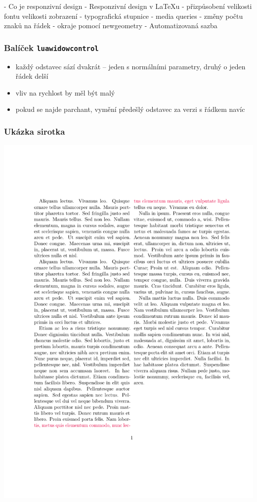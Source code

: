 - Co je responzivní design
- Responzivní design v LaTeXu
  - přizpůsobení velikosti fontu velikosti zobrazení
  - typografická stupnice
  - media queries
    - změny počtu znaků na řádek
    - okraje pomocí newgeometry
- Automatizovaná sazba

\begin{frame}
  \frametitle{Balíček \texttt{luawidowcontrol}}
  \begin{itemize}
    \item každý odstavec sází dvakrát -- jeden s normálními parametry, druhý o jeden řádek delší
    \item vliv na rychlost by měl být malý
    
    \item pokud se najde parchant, vymění předešlý odstavec za verzi s řádkem navíc
  \end{itemize}
\end{frame}

\begin{frame}
  \frametitle{Ukázka sirotka}
  \begin{center}
    \includegraphics[height=\textheight,page=1]{examples/widow.pdf}
  \end{center}
\end{frame}

